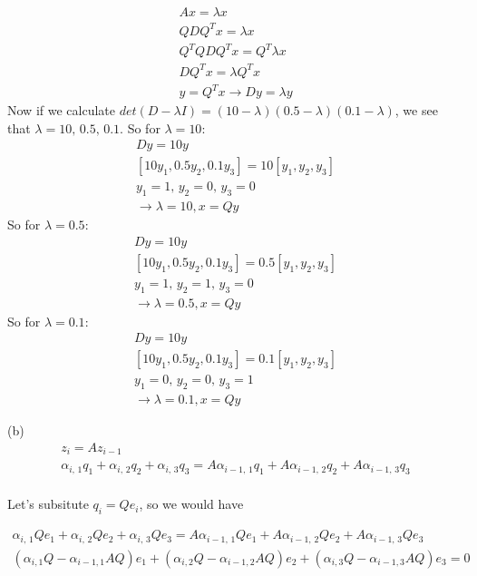 \documentclass{article}
\begin{document}
\begin{enumerate}[leftmargin=\labelsep]
		\begin{align}
			Ax = \lambda x\\
			QDQ^Tx = \lambda x\\
			Q^TQDQ^Tx = Q^T\lambda x\\
			DQ^Tx = \lambda Q^T x\\
			y = Q^Tx \rightarrow Dy = \lambda y 
		\end{align}
		Now if we calculate $det(D - \lambda I) = (10 - \lambda)(0.5 - \lambda)(0.1 - \lambda)$, we see that $\lambda = 10,\,0.5,\,0.1$.
		So for $\lambda = 10$:
		\begin{align}
			Dy = 10y\\
			[10y_1,0.5y_2,0.1y_3] = 10[y_1,y_2,y_3]\\
			y_1 = 1,\,y_2 = 0,\,y_3 = 0\\
			\rightarrow \lambda = 10, x = Qy
		\end{align}
		So for $\lambda = 0.5$:
		\begin{align}
			Dy = 10y\\
			[10y_1,0.5y_2,0.1y_3] = 0.5[y_1,y_2,y_3]\\
			y_1 = 1,\,y_2 = 1,\,y_3 = 0\\
			\rightarrow \lambda = 0.5, x = Qy
		\end{align}
		So for $\lambda = 0.1$:
		\begin{align}
			Dy = 10y\\
			[10y_1,0.5y_2,0.1y_3] = 0.1[y_1,y_2,y_3]\\
			y_1 = 0,\,y_2 = 0,\,y_3 = 1\\
			\rightarrow \lambda = 0.1, x = Qy
		\end{align}

		(b) 
		\begin{align}
			z_i = Az_{i-1}\\
			\alpha_{i,\,1} q_1 +\alpha_{i,\,2} q_2 + \alpha_{i,\,3} q_3 = A\alpha_{i-1,\,1} q_1 + A\alpha_{i-1,\,2} q_2 + A\alpha_{i-1,\,3} q_3\\
		\end{align}

		Let's subsitute $q_i = Qe_i$, so we would have 

		\begin{align}
			\alpha_{i,\,1} Qe_1 +\alpha_{i,\,2} Qe_2 + \alpha_{i,\,3} Qe_3 = A\alpha_{i-1,\,1} Qe_1 + A\alpha_{i-1,\,2} Qe_2 + A\alpha_{i-1,\,3} Qe_3\\
			(\alpha_{i,1}Q - \alpha_{i-1,1}AQ)e_1 + 
			(\alpha_{i,2}Q - \alpha_{i-1,2}AQ)e_2 +
			(\alpha_{i,3}Q - \alpha_{i-1,3}AQ)e_3 = 0 
		\end{align}


\end{enumerate}
\end{document}
